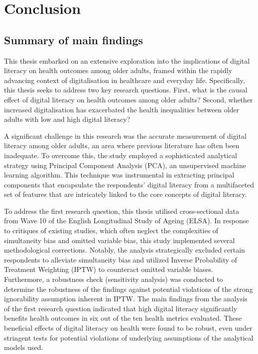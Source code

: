 \chapter{\label{ch:7-conclusion}Conclusion}

\section{Summary of main findings}
This thesis embarked on an extensive exploration into the implications of digital literacy on health outcomes among older adults, framed within the rapidly advancing context of digitalisation in healthcare and everyday life. Specifically, this thesis seeks to address two key research questions. First, what is the causal effect of digital literacy on health outcomes among older adults? Second, whether increased digitalisation has exacerbated the health inequalities between older adults with low and high digital literacy?

A significant challenge in this research was the accurate measurement of digital literacy among older adults, an area where previous literature has often been inadequate. To overcome this, the study employed a sophisticated analytical strategy using Principal Component Analysis (PCA), an unsupervised machine learning algorithm. This technique was instrumental in extracting principal components that encapsulate the respondents' digital literacy from a multifaceted set of features that are intricately linked to the core concepts of digital literacy.

To address the first research question, this thesis utilised cross-sectional data from Wave 10 of the English Longitudinal Study of Ageing (ELSA). In response to critiques of existing studies, which often neglect the complexities of simultaneity bias and omitted variable bias, this study implemented several methodological corrections. Notably, the analysis strategically excluded certain respondents to alleviate simultaneity bias and utilized Inverse Probability of Treatment Weighting (IPTW) to counteract omitted variable biases. Furthermore, a robustness check (sensitivity analysis) was conducted to determine the robustness of the findings against potential violations of the strong ignorability assumption inherent in IPTW. The main findings from the analysis of the first research question indicated that high digital literacy significantly benefits health outcomes in six out of the ten health metrics evaluated. These beneficial effects of digital literacy on health were found to be robust, even under stringent tests for potential violations of underlying assumptions of the analytical models used.


